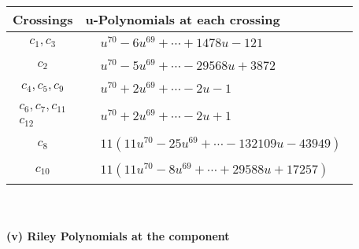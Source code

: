 \documentclass[1p]{elsarticle_modified}
\theoremstyle{definition}
\begin{document}
\begin{tabular}{m{50pt}|m{274pt}}
Crossings & \hspace{64pt}u-Polynomials at each crossing \\
\hline $$\begin{aligned}c_{1},c_{3}\end{aligned}$$&$\begin{aligned}
&u^{70}-6 u^{69}+\cdots+1478 u-121
\end{aligned}$\\
\hline $$\begin{aligned}c_{2}\end{aligned}$$&$\begin{aligned}
&u^{70}-5 u^{69}+\cdots-29568 u+3872
\end{aligned}$\\
\hline $$\begin{aligned}c_{4},c_{5},c_{9}\end{aligned}$$&$\begin{aligned}
&u^{70}+2 u^{69}+\cdots-2 u-1
\end{aligned}$\\
\hline $$\begin{aligned}c_{6},c_{7},c_{11}\\c_{12}\end{aligned}$$&$\begin{aligned}
&u^{70}+2 u^{69}+\cdots-2 u+1
\end{aligned}$\\
\hline $$\begin{aligned}c_{8}\end{aligned}$$&$\begin{aligned}
&11(11 u^{70}-25 u^{69}+\cdots-132109 u-43949)
\end{aligned}$\\
\hline $$\begin{aligned}c_{10}\end{aligned}$$&$\begin{aligned}
&11(11 u^{70}-8 u^{69}+\cdots+29588 u+17257)
\end{aligned}$\\
\hline
\end{tabular}\\~\\
\newpage\renewcommand{\arraystretch}{1}
\flushleft \textbf{(v) Riley Polynomials at the component}\newline \\
\end{document}
